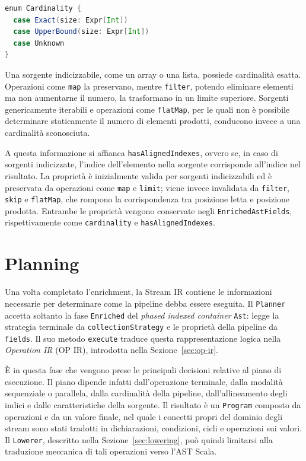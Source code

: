 \documentclass[a4paper,11pt]{report}
\theoremstyle{definition}
\begin{document}
\begin{lstlisting}[language=Scala]
enum Cardinality {
  case Exact(size: Expr[Int])
  case UpperBound(size: Expr[Int])
  case Unknown
}
\end{lstlisting}

Una sorgente indicizzabile, come un array o una lista, possiede cardinalità esatta. Operazioni come \texttt{map} la preservano, mentre \texttt{filter}, potendo eliminare elementi ma non aumentarne il numero, la trasformano in un limite superiore. Sorgenti genericamente iterabili e operazioni come \texttt{flatMap}, per le quali non è possibile determinare staticamente il numero di elementi prodotti, conducono invece a una cardinalità sconosciuta.

A questa informazione si affianca \texttt{hasAlignedIndexes}, ovvero se, in caso di sorgenti indicizzate, l'indice dell'elemento nella sorgente corrisponde all'indice nel risultato. La proprietà è inizialmente valida per sorgenti indicizzabili ed è preservata da operazioni come \texttt{map} e \texttt{limit}; viene invece invalidata da \texttt{filter}, \texttt{skip} e \texttt{flatMap}, che rompono la corrispondenza tra posizione letta e posizione prodotta. Entrambe le proprietà vengono conservate negli \texttt{EnrichedAstFields}, rispettivamente come \texttt{cardinality} e \texttt{hasAlignedIndexes}.

\section{Planning}
\label{sec:opir-translation}

Una volta completato l'enrichment, la Stream IR contiene le informazioni necessarie per determinare come la pipeline debba essere eseguita. Il \texttt{Planner} accetta soltanto la fase \texttt{Enriched} del \emph{phased indexed container} \texttt{Ast}: legge la strategia terminale da \texttt{collectionStrategy} e le proprietà della pipeline da \texttt{fields}. Il suo metodo \texttt{execute} traduce questa rappresentazione logica nella \emph{Operation IR} (OP IR), introdotta nella Sezione~\ref{sec:op-ir}.

È in questa fase che vengono prese le principali decisioni relative al piano di esecuzione. Il piano dipende infatti dall'operazione terminale, dalla modalità sequenziale o parallela, dalla cardinalità della pipeline, dall'allineamento degli indici e dalle caratteristiche della sorgente. Il risultato è un \texttt{Program} composto da operazioni e da un valore finale, nel quale i concetti propri del dominio degli stream sono stati tradotti in dichiarazioni, condizioni, cicli e operazioni sui valori. Il \texttt{Lowerer}, descritto nella Sezione~\ref{sec:lowering}, può quindi limitarsi alla traduzione meccanica di tali operazioni verso l'AST Scala.
\end{document}
